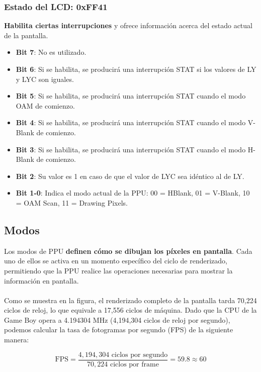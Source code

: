 \subsubsection{Estado del LCD: 0xFF41}
\textbf{Habilita ciertas interrupciones} y ofrece información acerca del estado actual de la pantalla.

\begin{itemize}
    \item \textbf{Bit 7}: No es utilizado.
    \item \textbf{Bit 6}: Si se habilita, se producirá una interrupción STAT si los valores de LY y LYC son iguales.
    \item \textbf{Bit 5}: Si se habilita, se producirá una interrupción STAT cuando el modo OAM de comienzo.
    \item \textbf{Bit 4}: Si se habilita, se producirá una interrupción STAT cuando el modo V-Blank de comienzo.
    \item \textbf{Bit 3}: Si se habilita, se producirá una interrupción STAT cuando el modo H-Blank de comienzo.
    \item \textbf{Bit 2}: Su valor es 1 en caso de que el valor de LYC sea idéntico al de LY.
    \item \textbf{Bit 1-0}: Indica el modo actual de la PPU: 00 = HBlank, 01 = V-Blank, 10 = OAM Scan, 11 = Drawing Pixels.
\end{itemize}

\subsection{Modos}

Los modos de PPU \textbf{definen cómo se dibujan los píxeles en pantalla}. Cada uno de ellos se activa en un momento específico del ciclo de renderizado, permitiendo que la PPU realice las operaciones necesarias para mostrar la información en pantalla.
\\\\
Como se muestra en la figura, el renderizado completo de la pantalla tarda 70,224 ciclos de reloj, lo que equivale a 17,556 ciclos de máquina. Dado que la CPU de la Game Boy opera a 4.194304 MHz (4,194,304 ciclos de reloj por segundo), podemos calcular la tasa de fotogramas por segundo (FPS) de la siguiente manera:

\[
\text{FPS} = \frac{4,194,304 \text{ ciclos por segundo}}{70,224 \text{ ciclos por frame}} = 59.8 \approx 60
\]


